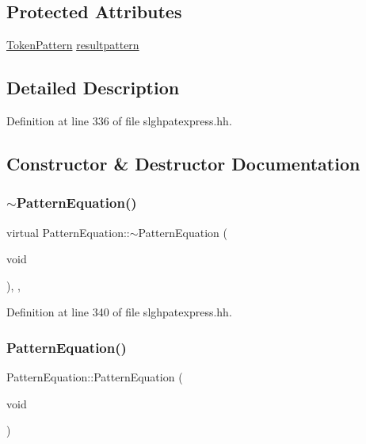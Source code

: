 \subsection*{Protected Attributes}
\begin{DoxyCompactItemize}
\item 
\mbox{\hyperlink{class_token_pattern}{Token\+Pattern}} \mbox{\hyperlink{class_pattern_equation_a1ee30230dcc5e8a9afbb2021e4286986}{resultpattern}}
\end{DoxyCompactItemize}


\subsection{Detailed Description}


Definition at line 336 of file slghpatexpress.\+hh.



\subsection{Constructor \& Destructor Documentation}
\mbox{\label{class_pattern_equation_a79801edb8a3dc404e183f2f9066944f5}} 
\subsubsection{\texorpdfstring{$\sim$PatternEquation()}{~PatternEquation()}}
{\footnotesize\ttfamily virtual Pattern\+Equation\+::$\sim$\+Pattern\+Equation (\begin{DoxyParamCaption}\item[{void}]{ }\end{DoxyParamCaption})\hspace{0.3cm}{\ttfamily [inline]}, {\ttfamily [protected]}, {\ttfamily [virtual]}}



Definition at line 340 of file slghpatexpress.\+hh.

\mbox{\label{class_pattern_equation_a54761134a1874653c6d86dd66bb16fe2}} 
\subsubsection{\texorpdfstring{PatternEquation()}{PatternEquation()}}
{\footnotesize\ttfamily Pattern\+Equation\+::\+Pattern\+Equation (\begin{DoxyParamCaption}\item[{void}]{ }\end{DoxyParamCaption})\hspace{0.3cm}{\ttfamily [inline]}}



